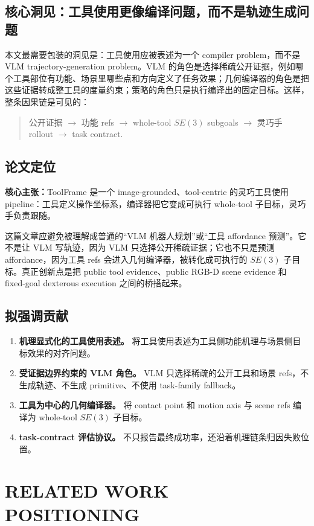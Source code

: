 \documentclass[letterpaper, 10 pt, conference]{ieeeconf}
\newcommand{\method}{ToolFrame}
\newcommand{\claim}[1]{\textbf{核心主张：}#1}
\begin{document}
\subsection{核心洞见：工具使用更像编译问题，而不是轨迹生成问题}
本文最需要包装的洞见是：工具使用应被表述为一个 compiler problem，而不是 VLM trajectory-generation problem。VLM 的角色是选择稀疏公开证据，例如哪个工具部位有功能、场景里哪些点和方向定义了任务效果；几何编译器的角色是把这些证据转成整工具的度量约束；策略的角色只是执行编译出的固定目标。这样，整条因果链是可见的：
\begin{quote}
公开证据 $\rightarrow$ 功能 refs $\rightarrow$ whole-tool $SE(3)$ subgoals
$\rightarrow$ 灵巧手 rollout $\rightarrow$ task contract.
\end{quote}

\subsection{论文定位}
\claim{\method{} 是一个 image-grounded、tool-centric 的灵巧工具使用 pipeline：工具定义操作坐标系，编译器把它变成可执行 whole-tool 子目标，灵巧手负责跟随。}

这篇文章应避免被理解成普通的“VLM 机器人规划”或“工具 affordance 预测”。它不是让 VLM 写轨迹，因为 VLM 只选择公开稀疏证据；它也不只是预测 affordance，因为工具 refs 会进入几何编译器，被转化成可执行的 $SE(3)$ 子目标。真正创新点是把 public tool evidence、public RGB-D scene evidence 和 fixed-goal dexterous execution 之间的桥搭起来。

\subsection{拟强调贡献}
\begin{enumerate}
  \item \textbf{机理显式化的工具使用表述。} 将工具使用表述为工具侧功能机理与场景侧目标效果的对齐问题。
  \item \textbf{受证据边界约束的 VLM 角色。} VLM 只选择稀疏的公开工具和场景 refs，不生成轨迹、不生成 primitive、不使用 task-family fallback。
  \item \textbf{工具为中心的几何编译器。} 将 contact point 和 motion axis 与 scene refs 编译为 whole-tool $SE(3)$ 子目标。
  \item \textbf{task-contract 评估协议。} 不只报告最终成功率，还沿着机理链条归因失败位置。
\end{enumerate}

\section{RELATED WORK POSITIONING}
\end{document}
